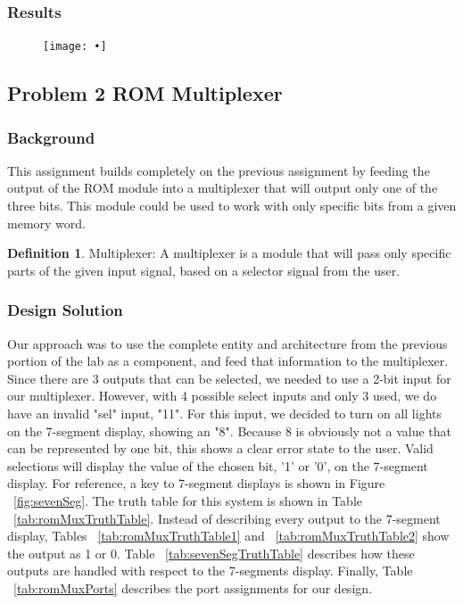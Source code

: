 \documentclass[11pt]{article}
\begin{document}
\subsubsection{Results}

\begin{figure}[H]
\begin{center}
	\texttt{[image: •]}
\end{center}
\end{figure}

\subsection{Problem 2 ROM Multiplexer}

\subsubsection{Background}
This assignment builds completely on the previous assignment by feeding the output of the ROM module into a multiplexer that will output only one of the three bits. This module could be used to work with only specific bits from a given memory word.

\theoremstyle{definition}
\newtheorem{definition}{Definition}
\begin{definition}
Multiplexer: A multiplexer is a module that will pass only specific parts of the given input signal, based on a selector signal from the user.
\end{definition}

\subsubsection{Design Solution}
Our approach was to use the complete entity and architecture from the previous portion of the lab as a component, and feed that information to the multiplexer. Since there are 3 outputs that can be selected, we needed to use a 2-bit input for our multiplexer. However, with 4 possible select inputs and only 3 used, we do have an invalid "sel" input, "11". For this input, we decided to turn on all lights on the 7-segment display, showing an "8". Because 8 is obviously not a value that can be represented by one bit, this shows a clear error state to the user. Valid selections will display the value of the chosen bit, '1' or '0', on the 7-segment display. For reference, a key to 7-segment displays is shown in Figure ~\ref{fig:sevenSeg}. The truth table for this system is shown in Table ~\ref{tab:romMuxTruthTable}. Instead of describing every output to the 7-segment display, Tables ~\ref{tab:romMuxTruthTable1} and ~\ref{tab:romMuxTruthTable2} show the output as 1 or 0. Table ~\ref{tab:sevenSegTruthTable} describes how these outputs are handled with respect to the 7-segments display. Finally, Table ~\ref{tab:romMuxPorts} describes the port assignments for our design.
\end{document}
